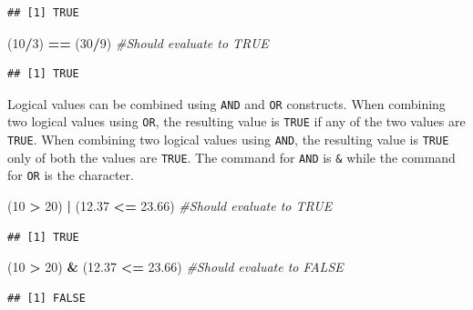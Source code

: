 \documentclass[]{krantz}
\makeatletter
\newenvironment{Shaded}{\begin{snugshade}}{\end{snugshade}}
\newcommand{\DecValTok}[1]{\textcolor[rgb]{0.06,0.06,0.06}{#1}}
\newcommand{\FloatTok}[1]{\textcolor[rgb]{0.06,0.06,0.06}{#1}}
\newcommand{\StringTok}[1]{\textcolor[rgb]{0.5,0.5,0.5}{#1}}
\newcommand{\CommentTok}[1]{\textcolor[rgb]{0.37,0.37,0.37}{\textit{#1}}}
\newcommand{\OperatorTok}[1]{\textcolor[rgb]{0.43,0.43,0.43}{\textbf{#1}}}
\newcommand{\NormalTok}[1]{#1}
\newenvironment{kframe}{%
\medskip{}
\setlength{\fboxsep}{.8em}
 \def\at@end@of@kframe{}%
 \ifinner\ifhmode%
  \def\at@end@of@kframe{\end{minipage}}%
  \begin{minipage}{\columnwidth}%
 \fi\fi%
 \def\FrameCommand##1{\hskip\@totalleftmargin \hskip-\fboxsep
 \colorbox{shadecolor}{##1}\hskip-\fboxsep
     \hskip-\linewidth \hskip-\@totalleftmargin \hskip\columnwidth}%
 \MakeFramed {\advance\hsize-\width
   \@totalleftmargin\z@ \linewidth\hsize
   \@setminipage}}%
 {\par\unskip\endMakeFramed%
 \at@end@of@kframe}
\renewenvironment{Shaded}{\begin{kframe}}{\end{kframe}}
\makeatother
\begin{document}
\begin{verbatim}
## [1] TRUE
\end{verbatim}

\begin{Shaded}
\begin{Highlighting}[]
\NormalTok{(}\DecValTok{10}\OperatorTok{/}\DecValTok{3}\NormalTok{) }\OperatorTok{==}\StringTok{ }\NormalTok{(}\DecValTok{30}\OperatorTok{/}\DecValTok{9}\NormalTok{) }\CommentTok{#Should evaluate to TRUE}
\end{Highlighting}
\end{Shaded}

\begin{verbatim}
## [1] TRUE
\end{verbatim}

Logical values can be combined using \texttt{AND} and \texttt{OR}
constructs. When combining two logical values using \texttt{OR}, the
resulting value is \texttt{TRUE} if any of the two values are
\texttt{TRUE}. When combining two logical values using \texttt{AND}, the
resulting value is \texttt{TRUE} only of both the values are
\texttt{TRUE}. The command for \texttt{AND} is \texttt{\&} while the
command for \texttt{OR} is the \texttt{\textbar{}} character.

\begin{Shaded}
\begin{Highlighting}[]
\NormalTok{(}\DecValTok{10} \OperatorTok{>}\StringTok{ }\DecValTok{20}\NormalTok{) }\OperatorTok{|}\StringTok{ }\NormalTok{(}\FloatTok{12.37} \OperatorTok{<=}\StringTok{ }\FloatTok{23.66}\NormalTok{) }\CommentTok{#Should evaluate to TRUE}
\end{Highlighting}
\end{Shaded}

\begin{verbatim}
## [1] TRUE
\end{verbatim}

\begin{Shaded}
\begin{Highlighting}[]
\NormalTok{(}\DecValTok{10} \OperatorTok{>}\StringTok{ }\DecValTok{20}\NormalTok{) }\OperatorTok{&}\StringTok{ }\NormalTok{(}\FloatTok{12.37} \OperatorTok{<=}\StringTok{ }\FloatTok{23.66}\NormalTok{) }\CommentTok{#Should evaluate to FALSE}
\end{Highlighting}
\end{Shaded}

\begin{verbatim}
## [1] FALSE
\end{verbatim}
\end{document}
